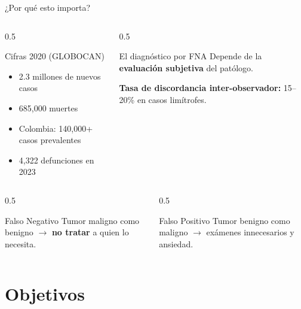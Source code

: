 \documentclass[10pt,aspectratio=169]{beamer}
\begin{document}
\begin{frame}{¿Por qué esto importa?}
\begin{columns}
\begin{column}{0.5\textwidth}
\begin{block}{Cifras 2020 (GLOBOCAN)}
\begin{itemize}
  \item 2.3 millones de nuevos casos
  \item 685,000 muertes
  \item Colombia: 140,000+ casos prevalentes
  \item 4,322 defunciones en 2023
\end{itemize}
\end{block}
\end{column}

\begin{column}{0.5\textwidth}
\begin{block}{El diagnóstico por FNA}
Depende de la \textbf{evaluación subjetiva} del patólogo.

\vspace{0.5em}
\textbf{Tasa de discordancia inter-observador:} 15--20\% en casos limítrofes.
\end{block}
\end{column}
\end{columns}

\vspace{1em}
\begin{columns}
\begin{column}{0.5\textwidth}
\begin{exampleblock}{Falso Negativo}
Tumor maligno como benigno $\rightarrow$ \textbf{no tratar} a quien lo necesita.
\end{exampleblock}
\end{column}

\begin{column}{0.5\textwidth}
\begin{block}{Falso Positivo}
Tumor benigno como maligno $\rightarrow$ exámenes innecesarios y ansiedad.
\end{block}
\end{column}
\end{columns}
\end{frame}

\section{Objetivos}
\end{document}
